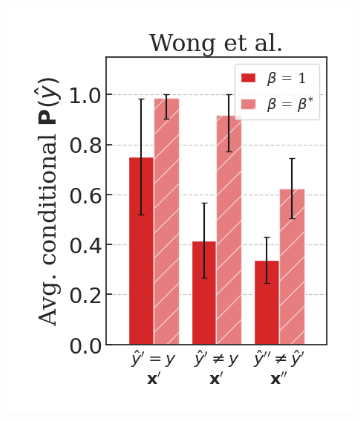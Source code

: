 \begin{figure}[H]
    \centering
    \begin{subfigure}[b]{0.3\textwidth}
        \centering
        \includegraphics[width=\textwidth]{img/results_discussion/adversarial/Wong2020Fast_short_PGD_0.0314_0.png}
    \end{subfigure}
    \begin{subfigure}[b]{0.3\textwidth}
        \centering

\end{subfigure}
\end{figure}
